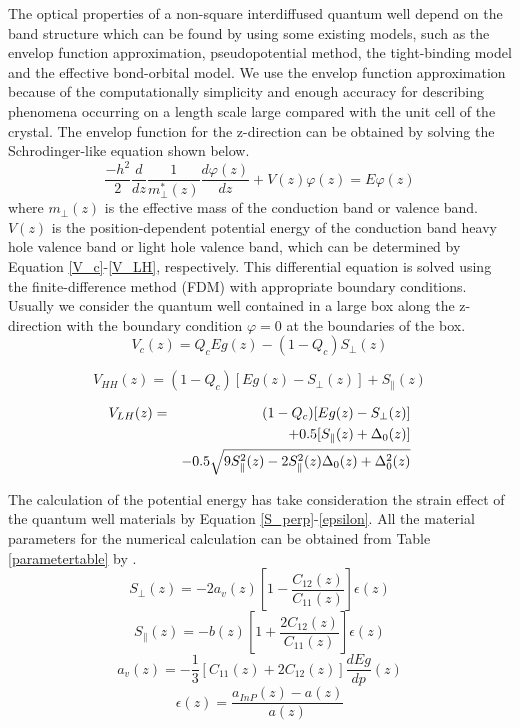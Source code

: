 The optical properties of a non-square interdiffused quantum well
depend on the band structure which can be found by using some
existing models, such as the envelop function approximation,
pseudopotential method, the tight-binding model and the effective
bond-orbital model. We use the envelop function approximation
because of the computationally simplicity and enough accuracy for
describing phenomena occurring on a length scale large compared with
the unit cell of the crystal. The envelop function for the
z-direction can be obtained by solving the Schrodinger-like equation
shown below.
\begin{equation}\label{schrodinger}
    \frac{-h^2}{2} \frac{d}{dz} \frac{1}{m_\perp^*(z)} \frac{d\varphi(z)}{dz}
    +V(z)\varphi(z)
        = E\varphi(z)
\end{equation}
where $m_\perp(z)$ is the effective mass of the
conduction band or valence band. $V(z)$ is the position-dependent
potential energy of the conduction band heavy hole valence band
or light hole valence band, which can be determined by Equation
\ref{V_c}-\ref{V_LH}, respectively.
This differential equation is solved using the
finite-difference method (FDM) with appropriate boundary conditions.
Usually we consider the quantum well contained in a large box along
the z-direction with the boundary condition $\varphi=0$ at the
boundaries of the box.
\begin{equation}\label{V_c}
    V_c(z)
        = Q_c Eg(z) - (1-Q_c)S_\perp(z)
\end{equation}

\begin{equation}\label{V_HH}
    V_{HH}(z)
        = (1-Q_c)[Eg(z) - S_\perp(z)] + S_\parallel(z)
\end{equation}

\begin{eqnarray}\label{V_LH}
    V_{LH}(z)&=& (1-Q_c)[Eg(z) - S_\perp(z)] \notag\\
    && +0.5[S_\parallel(z) + \Delta_0(z)] \notag\\
    && -0.5 \sqrt{9S_\parallel^2(z)-2S_\parallel^2(z)\Delta_0(z)+\Delta_0^2(z)}
\end{eqnarray}

The calculation of the potential energy has take consideration
the strain effect of the quantum well materials by
Equation \ref{S_perp}-\ref{epsilon}.
All the material parameters for the numerical calculation can be obtained
from Table \ref{parametertable} by \cite{table}.
\begin{equation}\label{S_perp}
    S_\perp(z)
        = -2a_v(z)[1-\frac{C_{12}(z)}{C_{11}(z)}] \epsilon(z)
\end{equation}
\begin{equation}\label{S_parallel}
    S_\parallel(z)
        = -b(z)[1+\frac{2C_{12}(z)}{C_{11}(z)}] \epsilon(z)
\end{equation}
\begin{equation}\label{a_v}
    a_v(z)
        = -\frac{1}{3}[C_{11}(z)+2C_{12}(z)] \frac{dEg}{dp}(z)
\end{equation}
\begin{equation}\label{epsilon}
    \epsilon(z)
        = \frac{a_{InP}(z)-a(z)}{a(z)}
\end{equation}

